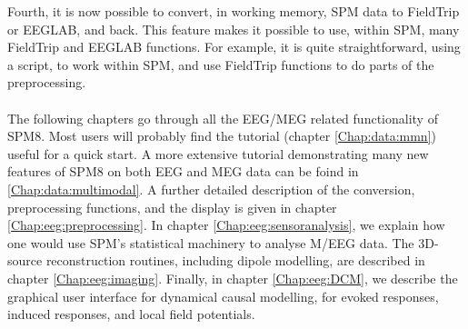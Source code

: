 Fourth, it is now possible to convert, in working memory, SPM data to FieldTrip or EEGLAB, and back. This feature makes it possible to use, within SPM, many FieldTrip and EEGLAB functions. For example, it is quite straightforward, using a script, to work within SPM, and use FieldTrip functions to do parts of the preprocessing.
\\
\\
The following chapters go through all the EEG/MEG related functionality of SPM8. Most users will probably find the tutorial (chapter \ref{Chap:data:mmn}) useful for a quick start. A more extensive tutorial demonstrating many new features of SPM8 on both EEG and MEG data can be foind in \ref{Chap:data:multimodal}. A further detailed description of the conversion, preprocessing functions, and the display is given in chapter \ref{Chap:eeg:preprocessing}. In chapter \ref{Chap:eeg:sensoranalysis}, we explain how one would use SPM's statistical machinery to analyse M/EEG data. The 3D-source reconstruction routines, including dipole modelling, are described in chapter \ref{Chap:eeg:imaging}. Finally, in chapter \ref{Chap:eeg:DCM}, we describe the graphical user interface for dynamical causal modelling, for evoked responses, induced responses, and local field potentials.
